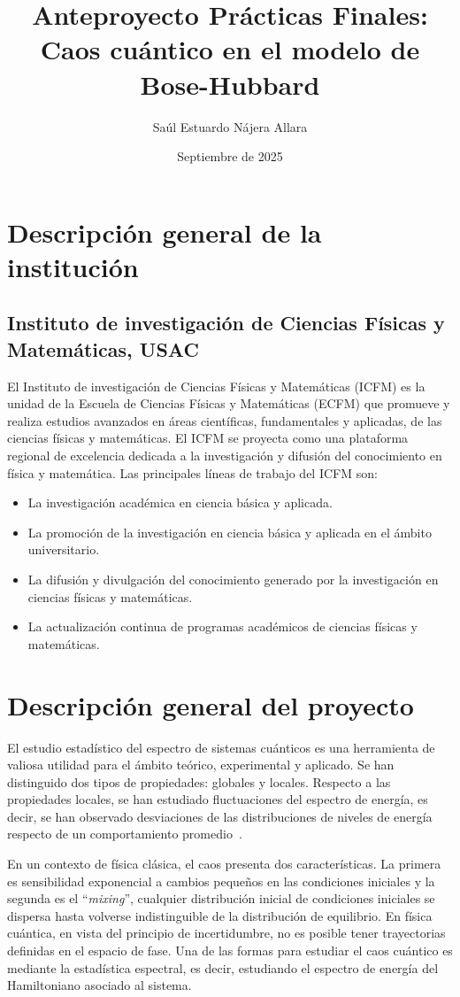 \documentclass[spanish,titlepage,table]{practicas}
\institute{
    Universidad de San Carlos de Guatemala\\[.5em]
    Escuela de Ciencias Físicas y Matemáticas
}
\title{
    {\LARGE Anteproyecto Prácticas Finales:}\\[0.5em]
   Caos cuántico en el modelo de\\[0.4em]
	 Bose-Hubbard 
}
\author{Saúl Estuardo Nájera Allara}
\date{Septiembre de 2025}
\begin{document}
\maketitle

\section{Descripción general de la institución}\label{sec:institution}
\subsection{Instituto de investigación de Ciencias Físicas y Matemáticas, USAC} 
El Instituto de investigación de Ciencias Físicas y Matemáticas (ICFM) es la unidad de la Escuela de Ciencias Físicas y Matemáticas (ECFM) que promueve y realiza estudios avanzados en áreas científicas, fundamentales y aplicadas, de las ciencias físicas y matemáticas. El ICFM se proyecta como una plataforma regional de excelencia dedicada a la investigación y difusión del conocimiento en física y matemática. Las principales líneas de trabajo del ICFM son:
\begin{itemize}
    \item La investigación académica en ciencia básica y aplicada.
    \item La promoción de la investigación en ciencia básica y aplicada en el ámbito universitario.
    \item La difusión y divulgación del conocimiento generado por la investigación en ciencias físicas y matemáticas.
    \item La actualización continua de programas académicos de ciencias físicas y matemáticas.
\end{itemize}

\section{Descripción general del proyecto}\label{sec:description}
El estudio estadístico del espectro de sistemas cuánticos es una herramienta de valiosa utilidad para el ámbito teórico, experimental y aplicado.
Se han distinguido dos tipos de propiedades: globales y locales.
Respecto a las propiedades locales, se han estudiado fluctuaciones del espectro de energía, es decir, se han observado desviaciones de las distribuciones de niveles de energía respecto de un comportamiento promedio~\cite{Bohigas_1984}.


En un contexto de física clásica, el caos presenta dos características. 
La primera es sensibilidad exponencial a cambios pequeños en 
las condiciones iniciales y la segunda es el ``\textit{mixing}'', cualquier distribución inicial de condiciones iniciales se dispersa hasta volverse indistinguible de la distribución de equilibrio. 
En física cuántica, en vista del principio de incertidumbre, no es posible tener 
trayectorias definidas en el espacio de fase. Una de las formas para estudiar el caos cuántico es mediante la estadística espectral, es decir, estudiando el espectro de energía del Hamiltoniano asociado al sistema.
\end{document}
